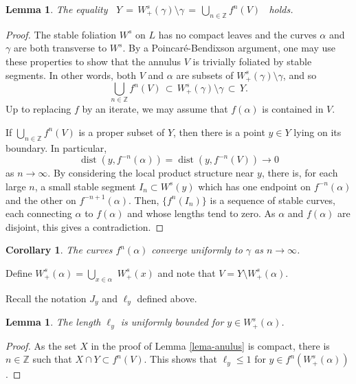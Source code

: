 \documentclass[11pt]{amsart} %
\newcommand{\bbZ}{\mathbb{Z}}
\newcommand{\Ws}{W^s}
\newcommand{\Wsp}{W^s_+}
\newcommand{\sans}{\setminus}
\newcommand{\subof}{\subset}
\newcommand{\invn}{^{-n}}
\newcommand{\dist}{\operatorname{dist}}
\numberwithin{equation}{section}
\newtheorem{cor}[equation]{Corollary}
\newtheorem{lemma}[equation]{Lemma}
\theoremstyle{remark}
\begin{document}
\begin{lemma} \label{lemma:Yequals}
    The equality
    \, $Y \, = \, \Wsp(\gamma) \setminus \gamma \, = \,
    \bigcup_{n  \in  \bbZ} f^n(V)$ \, holds.
\end{lemma}
\begin{proof}
    The stable foliation $\Ws$ on $L$ has no compact leaves
    and the curves $\alpha$ and $\gamma$ are both transverse to $\Ws$.
    By a Poincar\'e-Bendixson argument,
    one may use these properties to
    show that the annulus $V$ is trivially foliated
    by stable segments.
    In other words, both $V$ and $\alpha$ are subsets of 
    $\Wsp(\gamma) \setminus \gamma$, and so
    \[
        \bigcup_{n  \in  \bbZ} f^n(V)
        \, \subof \,
        \Wsp(\gamma) \setminus \gamma
        \, \subof \,
        Y.
    \]
    Up to replacing $f$ by an iterate,
    we may assume that $f(\alpha)$ is contained in $V$.

    If $\bigcup_{n  \in  \bbZ} f^n(V)$ is a proper subset of $Y$,
    then there is a point $y  \in  Y$ lying on its boundary.
    In particular,
    \[
    \dist(y, f \invn(\alpha)) = \dist(y,  f \invn(V))  \to  0
    \]
    as $n  \to  \infty$.
    By considering the local product structure near $y$,
    there is, for each large $n$, a small stable segment $I_n \subof \Ws(y)$
    which has one endpoint on $f \invn(\alpha)$ and the other on $f^{-n+1}(\alpha)$.
    Then, $\{f^n(I_n)\}$ is a sequence of stable curves, each connecting
    $\alpha$ to $f(\alpha)$ and whose lengths tend to zero.
    As $\alpha$ and $f(\alpha)$ are disjoint, this gives a contradiction.
\end{proof}



\begin{cor} \label{cor:alconverge}
    The curves $f^n(\alpha)$ converge uniformly to $\gamma$ as $n  \to  \infty$.
\end{cor}
Define $\Wsp(\alpha) = \bigcup_{x  \in  \alpha}$ $\Wsp(x)$
and note that $V = Y \sans \Wsp(\alpha)$.

Recall the notation $J_y$ and $\ell_y$ defined above.

\begin{lemma} \label{lemma:lfinite}
    The length $\ell_y$ is uniformly bounded for $y  \in  \Wsp(\alpha)$.
\end{lemma}
\begin{proof}
    As the set $X$ in the proof of Lemma \ref{lema-anulus} is compact,
    there is $n  \in  \bbZ$ such that $X \cap Y \subof f^n(V)$.
    This shows that $\ell_y  \le  1$ for $y  \in   f^n(\Wsp(\alpha))$.
\end{proof}
\end{document}
